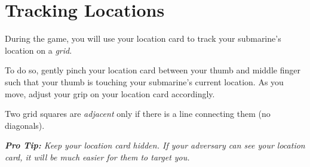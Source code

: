 \section*{Tracking Locations}
During the game, you will use your location card to track your submarine's location on a \emph{grid}. 

To do so, gently pinch your location card between your thumb and middle finger such that your thumb is touching your submarine's current location.
As you move, adjust your grip on your location card accordingly.

Two grid squares are \emph{adjacent} only if there is a line connecting them (no diagonals).

\textit{\textbf{Pro Tip:} Keep your location card hidden. If your adversary can see your location card, it will be much easier for them to target you.}
